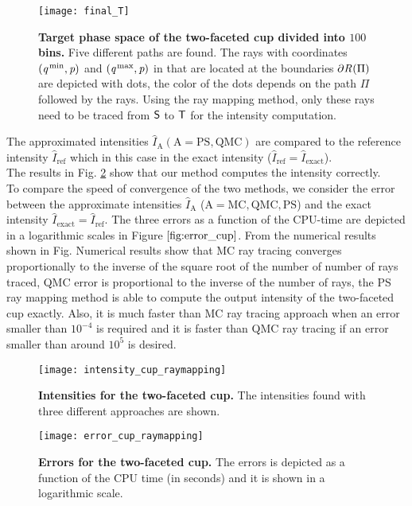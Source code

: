 \begin{figure}[t]
  \begin{center}
  \texttt{[image: final\_T]}
  \end{center}
  \caption{\textbf{Target phase space of the two-faceted cup divided into $100$ bins.}
  Five different paths are found. The rays with coordinates $(\textit{q}^\textrm{\,min}, \textit{p})$ and $(\textit{q}^\textrm{\,max}, \textit{p})$ in  that are located at the boundaries $\partial \mbox{$\emph{R}_{\textit{}}$}(\Pi)$ are depicted with dots, the color of the dots depends on the path $\Pi$ followed by the rays.
  Using the ray mapping method, only these rays need to be traced from $\textsf{S}$ to $\textsf{T}$ for the intensity computation.}
  \label{fig:final_T}
\end{figure} 
The approximated intensities $\hat{I}_{\textrm{A}} (\textrm{A} = \textrm{PS},  \textrm{QMC})$ are compared to the reference intensity $\hat{I}_\textrm{ref}$ which in this case in the exact intensity ($\hat{I}_{\textrm{ref}}=\hat{I}_{\textrm{exact}}$).
\\ \indent 
The results in Fig. \ref{fig:intensity_cup} show that our method computes the intensity correctly. 
 \\ \indent
To compare the speed of convergence of the two methods, we consider the error between the approximate intensities $\hat{I}_{\textrm{A}}$ ($\textrm{A} = \textrm{MC}, \textrm{QMC}, \textrm{PS}$) and the exact intensity $\hat{I}_{\mbox{exact}} = \hat{I}_{\mbox{ref}}$.
The three errors as a function of the CPU-time are depicted in a logarithmic scales in Figure $\ref{fig:error_cup}$. From the numerical results shown in Fig. 
Numerical results show that MC ray tracing converges proportionally to the inverse of the square root of the number of number of rays traced, QMC error is proportional to the inverse of the number of rays, the PS ray mapping method is able to compute the output intensity of the two-faceted cup exactly. Also, it is much faster than MC ray tracing approach when an error smaller than $10^{-4}$ is required and it is faster than QMC ray tracing if an error smaller than around $10^5$ is desired.
\begin{figure}[t]
  \begin{center}
  \texttt{[image: intensity\_cup\_raymapping]}
  \end{center}
  \caption{\textbf{Intensities for the two-faceted cup.} The intensities found with three different approaches are shown.}
  \label{fig:intensity_cup}
\end{figure}
\begin{figure}[h]
  \begin{center}
  \texttt{[image: error\_cup\_raymapping]}
  \end{center}
  \caption{\textbf{Errors for the two-faceted cup.} The errors is depicted as a function of the CPU time (in seconds) and it is shown in a logarithmic scale.}
  \label{fig:error_cup}
\end{figure}

